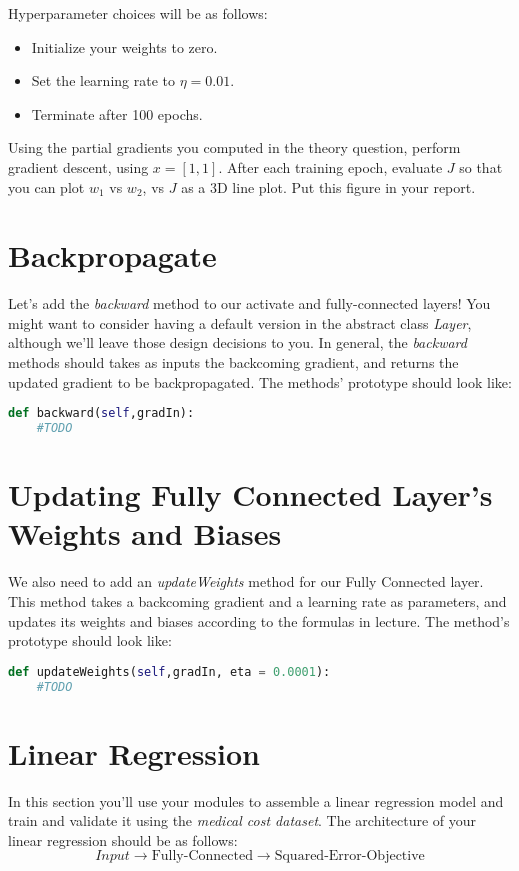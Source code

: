 \documentclass[12pt]{article}
\begin{document}
\noindent
Hyperparameter choices will be as follows:
\begin{itemize}
\item Initialize your weights to zero.
\item Set the learning rate to $\eta=0.01$.
\item Terminate after 100 epochs.
\end{itemize}

\noindent
Using the partial gradients you computed in the theory question, perform gradient descent, using $x=[1, 1]$.  After each training epoch, evaluate $J$ so that you can plot $w_1$ vs $w_2$, vs $J$ as a 3D line plot.  Put this figure in your report.

\section{Backpropagate}
Let's add the \emph{backward} method to our activate and fully-connected layers!  You might want to consider having a default version in the abstract class \emph{Layer}, although we'll leave those design decisions to you.  In general, the \emph{backward} methods should takes as inputs the backcoming gradient, and returns the updated gradient to be backpropagated.  The methods' prototype should look like:

\begin{lstlisting}[language=Python]
  def backward(self,gradIn):
    #TODO
\end{lstlisting}

\section{Updating Fully Connected Layer's Weights and Biases}
We also need to add an \emph{updateWeights} method for our Fully Connected layer.  This method takes a backcoming gradient and a learning rate as parameters, and updates its weights and biases according to the formulas in lecture.  The method's prototype should look like:

\begin{lstlisting}[language=Python]
  def updateWeights(self,gradIn, eta = 0.0001):
    #TODO
\end{lstlisting}

\newpage
\section{Linear Regression}
In this section you'll use your modules to assemble a linear regression model and train and validate it using the \emph{medical cost dataset}.  The architecture of your linear regression should be as follows:
$$Input \rightarrow  \textrm{Fully-Connected} \rightarrow \textrm{Squared-Error-Objective}$$
\end{document}
